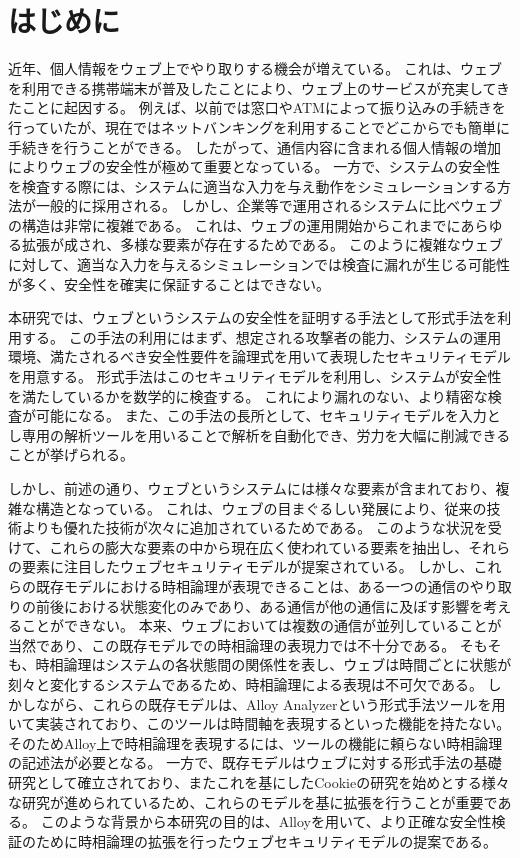 \documentclass[12pt,a4paper]{jbook}
\begin{document}
\chapter{はじめに}
近年、個人情報をウェブ上でやり取りする機会が増えている。
これは、ウェブを利用できる携帯端末が普及したことにより、ウェブ上のサービスが充実してきたことに起因する。
例えば、以前では窓口やATMによって振り込みの手続きを行っていたが、現在ではネットバンキングを利用することでどこからでも簡単に手続きを行うことができる。
したがって、通信内容に含まれる個人情報の増加によりウェブの安全性が極めて重要となっている。
\color{red}
一方で、システムの安全性を検査する際には、システムに適当な入力を与え動作をシミュレーションする方法が一般的に採用される。
しかし、企業等で運用されるシステムに比べウェブの構造は非常に複雑である。
これは、ウェブの運用開始からこれまでにあらゆる拡張が成され、多様な要素が存在するためである。
このように複雑なウェブに対して、適当な入力を与えるシミュレーションでは検査に漏れが生じる可能性が多く、安全性を確実に保証することはできない。
\color{black}

本研究では、ウェブというシステムの安全性を証明する手法として形式手法を利用する。
この手法の利用にはまず、想定される攻撃者の能力、システムの運用環境、満たされるべき安全性要件を論理式を用いて表現したセキュリティモデルを用意する。
形式手法はこのセキュリティモデルを利用し、システムが安全性を満たしているかを数学的に検査する。
これにより漏れのない、より精密な検査が可能になる。
また、この手法の長所として、セキュリティモデルを入力とし専用の解析ツールを用いることで解析を自動化でき、労力を大幅に削減できることが挙げられる。

しかし、前述の通り、ウェブというシステムには様々な要素が含まれており、複雑な構造となっている。
これは、ウェブの目まぐるしい発展により、従来の技術よりも優れた技術が次々に追加されているためである。
このような状況を受けて、これらの膨大な要素の中から現在広く使われている要素を抽出し、それらの要素に注目したウェブセキュリティモデルが提案されている\cite{webmodel,cookie-model}。
しかし、これらの既存モデルにおける時相論理が表現できることは、ある一つの通信のやり取りの前後における状態変化のみであり、ある通信が他の通信に及ぼす影響を考えることができない。
本来、ウェブにおいては複数の通信が並列していることが当然であり、この既存モデルでの時相論理の表現力では不十分である。
そもそも、時相論理はシステムの各状態間の関係性を表し、ウェブは時間ごとに状態が刻々と変化するシステムであるため、時相論理による表現は不可欠である。
\color{red}
しかしながら、これらの既存モデル\cite{webmodel,cookie-model}は、Alloy Analyzerという形式手法ツールを用いて実装されており、このツールは時間軸を表現するといった機能を持たない。
そのためAlloy上で時相論理を表現するには、ツールの機能に頼らない時相論理の記述法が必要となる。
一方で、既存モデル\cite{webmodel}はウェブに対する形式手法の基礎研究として確立されており、またこれを基にしたCookieの研究\cite{cookie-model}を始めとする様々な研究が進められているため、これらのモデルを基に拡張を行うことが重要である。
このような背景から本研究の目的は、Alloyを用いて、より正確な安全性検証のために時相論理の拡張を行ったウェブセキュリティモデルの提案である。
\color{black}
\end{document}
